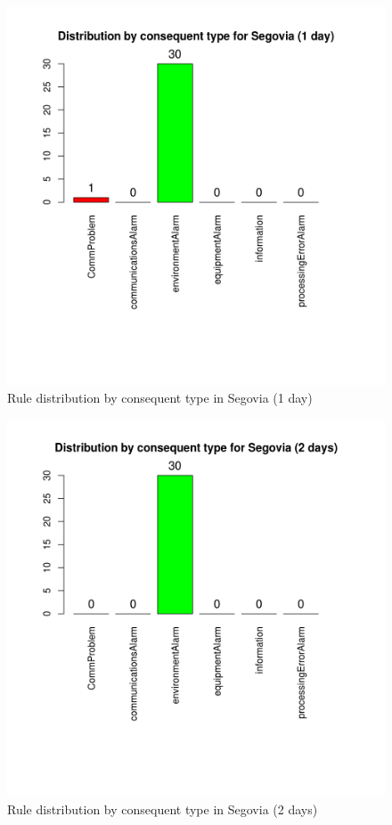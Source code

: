 \documentclass[a4paper,12pt]{article}
\begin{document}
\begin{figure}[hbtp]
\includegraphics[width=\textwidth]{img/conseqtypes_seg1.png}
\caption{Rule distribution by consequent type in Segovia (1 day)} \label{fig:conseqtypes_seg1}
\end{figure}

\begin{figure}[hbtp]
\includegraphics[width=\textwidth]{img/conseqtypes_seg2.png}
\caption{Rule distribution by consequent type in Segovia (2 days)} \label{fig:conseqtypes_seg2}
\end{figure}
\end{document}
